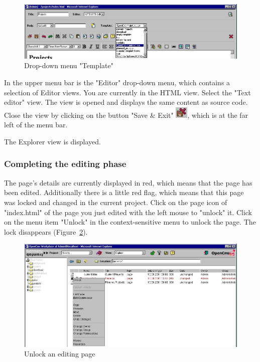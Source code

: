 \begin{figure}[h]
\begin{center}
\includegraphics[width=\sgw]
                   {pics/usermanual/selectTemplate}
\caption[Drop-down menu "Template"]
           {Drop-down menu "Template"}
\label{selecttemplate}
\end{center}
\end{figure}

In the upper menu bar is the "Editor" drop-down menu, which
contains a selection of Editor views. You are currently in the
HTML view. Select the "Text editor" view. The view is opened and
displays the same content as source code. Close the view by
clicking on the button "Save \& Exit"
\includegraphics{pics/usermanual/ic_saveexit}, which is at the far
left of the menu bar.

The Explorer view is displayed.

\subsubsection{Completing the editing phase}

The page's details are currently displayed in red, which means
that the page has been edited. Additionally there is a little red
flag, which means that this page was locked and changed in the
current project. Click on the page icon of "index.html" of the
page you just edited with the left mouse to "unlock" it. Click on
the menu item "Unlock" in the context-sensitive menu to unlock the
page. The lock disappears (Figure~\ref{unlockpage}).

\begin{figure}[h]
\begin{center}
\includegraphics[width=\sgw]
                   {pics/usermanual/unlockPage}
\caption[Unlock an editing page]
           {Unlock an editing page}
\label{unlockpage}
\end{center}
\end{figure}

